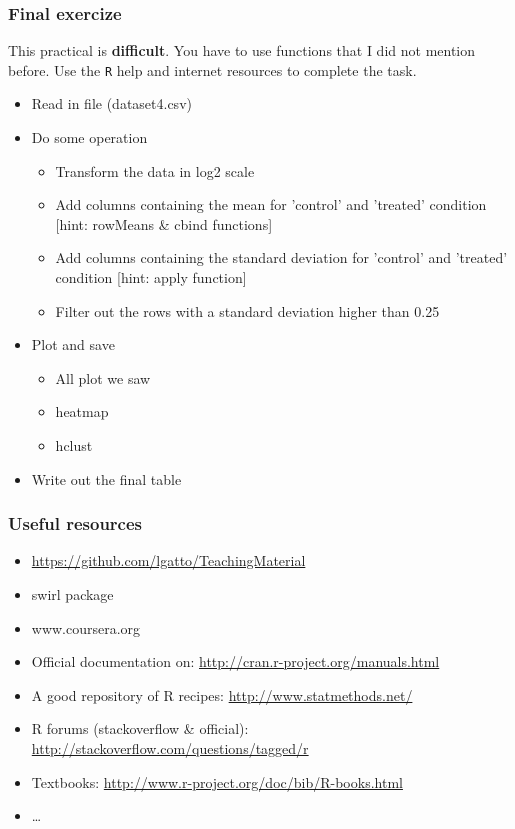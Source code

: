 \documentclass{beamer}
\begin{document}
\begin{frame}[fragile]
	\frametitle{Final exercize}
	This practical is \textbf{difficult}. You have to use functions that I did not mention before. Use the \texttt{R} help and internet resources to complete the task.
	\begin{itemize}
		\item Read in file (dataset4.csv)
		\item Do some operation
			\begin{itemize}
				\item Transform the data in log2 scale
				\item Add columns containing the mean for 'control' and 'treated' condition \tiny[hint: rowMeans \& cbind functions] \small
				\item Add columns containing the standard deviation for 'control' and 'treated' condition \tiny[hint: apply function] \small
				\item Filter out the rows with a standard deviation higher than 0.25
			\end{itemize}
		\item Plot and save
			\begin{itemize}
				\item All plot we saw
				\item heatmap
				\item hclust
			\end{itemize}
		\item Write out the final table
	\end{itemize}

\end{frame}



\begin{frame}[fragile]
	\frametitle{Useful resources}
	\begin{itemize}
		\item \url{https://github.com/lgatto/TeachingMaterial}
		\item swirl package
		\item www.coursera.org
		\item Official documentation on: \url{http://cran.r-project.org/manuals.html}
		\item A good repository of R recipes: \url{http://www.statmethods.net/}
		\item R forums (stackoverflow \& official): \url{http://stackoverflow.com/questions/tagged/r}
		\item Textbooks: \url{http://www.r-project.org/doc/bib/R-books.html}
		\item \ldots
	\end{itemize}
\end{frame}
\end{document}
